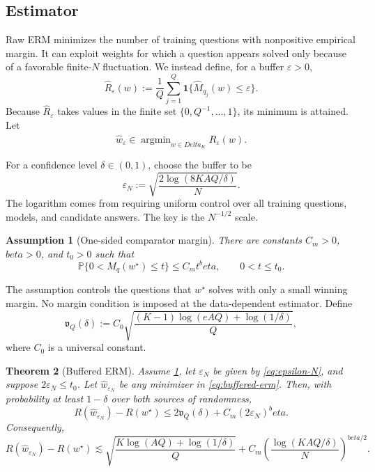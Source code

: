 \documentclass[11pt]{article}
\def\beta{beta}%
\def\Delta{Delta}%
\newtheorem{theorem}{Theorem}[section]
\newtheorem{assumption}[theorem]{Assumption}
\newcommand{\Pp}{\mathbb P}
\newcommand{\one}{\mathbf 1}
\newcommand{\eps}{\varepsilon}
\DeclareMathOperator*{\argmin}{argmin}
\begin{document}
\subsection{Estimator}

Raw ERM minimizes the number of training questions with nonpositive empirical margin.  It can exploit weights for which a question appears solved only because of a favorable finite-$N$ fluctuation.  We instead define, for a buffer $\eps>0$,
\begin{equation}
\label{eq:buffered-risk}
\widehat R_\eps(w)
:=
\frac1Q\sum_{j=1}^Q\one\{\widehat M_{q_j}(w)\le\eps\}.
\end{equation}
Because $\widehat R_\eps$ takes values in the finite set $\{0,Q^{-1},\dots,1\}$, its minimum is attained.  Let
\begin{equation}
\label{eq:buffered-erm}
\widehat w_\eps
\in
\argmin_{w\in\Delta_K}\widehat R_\eps(w).
\end{equation}

For a confidence level $\delta\in(0,1)$, choose the buffer to be
\begin{equation}
\label{eq:epsilon-N}
\eps_N
:=
\sqrt{\frac{2\log(8KAQ/\delta)}{N}}.
\end{equation}
The logarithm comes from requiring uniform control over all training questions, models, and candidate answers.  The key is the $N^{-1/2}$ scale.

\begin{assumption}[One-sided comparator margin]
\label{ass:one-sided-margin}
There are constants $C_m>0$, $\beta>0$, and $t_0>0$ such that
\begin{equation}
\label{eq:one-sided-margin}
\Pp\{0<M_q(w^\star)\le t\}
\le C_m t^\beta,
\qquad 0<t\le t_0.
\end{equation}
\end{assumption}

The assumption controls the questions that $w^\star$ solves with only a small winning margin.  No margin condition is imposed at the data-dependent estimator.  Define
\begin{equation}
\label{eq:vq}
\mathfrak v_Q(\delta)
:=
C_0
\sqrt{
\frac{(K-1)\log(eAQ)+\log(1/\delta)}{Q}
},
\end{equation}
where $C_0$ is a universal constant.

\begin{theorem}[Buffered ERM]
\label{thm:buffered-main}
Assume \cref{ass:one-sided-margin}, let $\eps_N$ be given by \eqref{eq:epsilon-N}, and suppose $2\eps_N\le t_0$.  Let $\widehat w_{\eps_N}$ be any minimizer in \eqref{eq:buffered-erm}.  Then, with probability at least $1-\delta$ over both sources of randomness,
\begin{equation}
\label{eq:buffered-bound-exact}
R(\widehat w_{\eps_N})-R(w^\star)
\le
2\mathfrak v_Q(\delta)
+C_m(2\eps_N)^\beta.
\end{equation}
Consequently,
\begin{equation}
\label{eq:buffered-bound-rate}
R(\widehat w_{\eps_N})-R(w^\star)
\lesssim
\sqrt{\frac{K\log(AQ)+\log(1/\delta)}{Q}}
+
C_m\left(\frac{\log(KAQ/\delta)}{N}\right)^{\beta/2}.
\end{equation}
\end{theorem}
\end{document}
